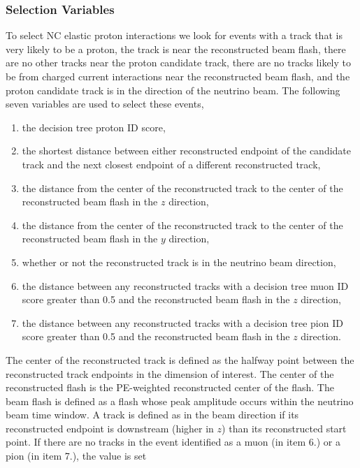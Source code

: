   \subsubsection{Selection Variables}\label{sec:selectionvars}
    To select NC elastic proton interactions we look for events with a track
    that is very likely to be a proton, the track is near the reconstructed
    beam flash, there are no other tracks near the proton candidate track,
    there are no tracks likely to be from charged current interactions near the
    reconstructed beam flash, and the proton candidate track is in the
    direction of the neutrino beam. The following seven variables are used to
    select these events,
    \begin{enumerate}
      \item the decision tree proton ID score,
      \item the shortest distance between either reconstructed endpoint of the
      candidate track and the next closest endpoint of a different
      reconstructed track,
      \item the distance from the center of the reconstructed track to the
      center of the reconstructed beam flash in the $z$ direction,
      \item the distance from the center of the reconstructed track to the
      center of the reconstructed beam flash in the $y$ direction,
      \item whether or not the reconstructed track is in the neutrino beam
      direction,
      \item the distance between any reconstructed tracks with a decision tree
      muon ID score greater than 0.5 and the reconstructed beam flash in the
      $z$ direction,
      \item the distance between any reconstructed tracks with a decision tree
      pion ID score greater than 0.5 and the reconstructed beam flash in the
      $z$ direction.
    \end{enumerate}
    The center of the reconstructed track is defined as the halfway point
    between the reconstructed track endpoints in the dimension of interest. The
    center of the reconstructed flash is the PE-weighted reconstructed center
    of the flash. The beam flash is defined as a flash whose peak amplitude
    occurs within the neutrino beam time window. A track is defined as in the
    beam direction if its reconstructed endpoint is downstream (higher in $z$)
    than its reconstructed start point. If there are no tracks in the event
    identified as a muon (in item 6.) or a pion (in item 7.), the value is set
